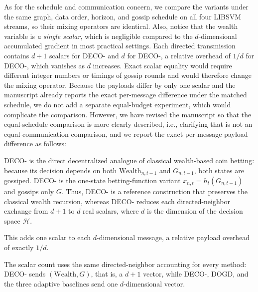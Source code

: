 \documentclass[12pt,english]{reviewresponse}
\newcommand{\algname}{{DECO}\xspace}
\newcommand{\w}{\text{Wealth}}
\newcommand{\Hil}{\mathcal{H}}
\begin{document}
\begin{revresponse}
    As for the schedule and communication concern, we compare the variants under the same graph, data order, horizon, and gossip schedule on all four LIBSVM streams, so their mixing operators are identical.
    Also, notice that the wealth variable is \emph{a single scalar}, which is negligible compared to the $d$-dimensional accumulated gradient in most practical settings.
    Each directed transmission contains $d+1$ scalars for \algname{}- and $d$ for \algname{}-, a relative overhead of $1/d$ for \algname{}-, which vanishes as $d$ increases.
    Exact scalar equality would require different integer numbers or timings of gossip rounds and would therefore change the mixing operator.  Because the payloads differ by only one scalar and the manuscript already reports the exact per-message difference under the matched schedule, we do not add a separate equal-budget experiment, which would complicate the comparison.
    However, we have revised the manuscript so that the equal-schedule comparison is more clearly described, i.e., clarifying that is not an equal-communication comparison, and we report the exact per-message payload difference as follows:
    \begin{changes}
        \algname{}- is the direct decentralized analogue of classical wealth-based coin betting: because its decision depends on both $\w_{n,t-1}$ and $G_{n,t-1}$, both states are gossiped.
        \algname{}- is the one-state betting-function variant $x_{n,t}=h_t(G_{n,t-1})$ and gossips only $G$.
        Thus, \algname{}- is a reference construction that preserves the classical wealth recursion, whereas \algname{}- reduces each directed-neighbor exchange from $d+1$ to $d$ real scalars, where $d$ is the dimension of the decision space $\Hil$.

        This adds one scalar to each $d$-dimensional message, a relative payload overhead of exactly $1/d$.

        The scalar count uses the same directed-neighbor accounting for every method: \algname{}- sends $(\w,G)$, that is, a $d+1$ vector, while \algname{}-, DOGD, and the three adaptive baselines send one $d$-dimensional vector.
    \end{changes}
\end{revresponse}
\end{document}
